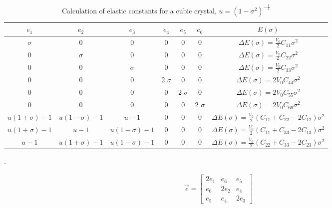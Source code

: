 \renewcommand{\arraystretch}{1.7}
\begin{table}[!htbp]
\centering
\begin{tabular}{c c c c c c c}
\hline\hline
$e_1$ & $e_2$ & $e_3$ & $e_4$ & $e_5$ & $e_6$ & $E(\sigma)$ \\
\hline\hline
$\sigma$ & 0 & 0 & 0 & 0 & 0 & $\Delta E(\sigma) = \frac{V_{0}}{2} C_{11} \sigma^2$ \\
0 & $\sigma$ & 0 & 0 & 0 & 0 & $\Delta E(\sigma) = \frac{V_{0}}{2} C_{22} \sigma^2$ \\
0 & 0 & $\sigma$ & 0 & 0 & 0 & $\Delta E(\sigma) = \frac{V_{0}}{2} C_{33} \sigma^2$ \\

0 & 0 & 0 & 2 $\sigma$ & 0 & 0 & $\Delta E(\sigma) = 2 V_{0} C_{44} \sigma^2$ \\
0 & 0 & 0 & 0 & 2 $\sigma$ & 0 & $\Delta E(\sigma) = 2 V_{0} C_{55} \sigma^2$ \\
0 & 0 & 0 & 0 & 0 & 2 $\sigma$ & $\Delta E(\sigma) = 2 V_{0} C_{66} \sigma^2$ \\

$u (1+\sigma) - 1$ & $u (1-\sigma) - 1$ & $u - 1$ & 0 & 0 & 0 & $\Delta E(\sigma) = \frac{V_{0}}{2} (C_{11} + C_{22} - 2 C_{12}) \sigma^2$ \\
$u (1+\sigma) - 1$ & $u - 1$ & $u (1-\sigma) - 1$ & 0 & 0 & 0 & $\Delta E(\sigma) = \frac{V_{0}}{2} (C_{11} + C_{33} - 2 C_{13}) \sigma^2$ \\
$u - 1$ & $u (1+\sigma) - 1$ & $u (1-\sigma) - 1$ & 0 & 0 & 0 & $\Delta E(\sigma) = \frac{V_{0}}{2} (C_{22} + C_{33} - 2 C_{23}) \sigma^2$ \\

\end{tabular}
\label{tab:ctcubic}
\caption{Calculation of elastic constants for a cubic crystal\cite{orthonisi}, $u = (1-\sigma^2)^{-\frac{1}{3}}$}.
\end{table}


\begin{equation}
\begin{split}
\vec{\epsilon} = \begin{bmatrix} 2 e_1 & e_6 & e_5 \\ e_6 & 2 e_2 & e_4 \\ e_5 & e_4 & 2 e_3 \end{bmatrix}
\end{split}
\label{eq:eqStrainMatrixCT}
\end{equation}


